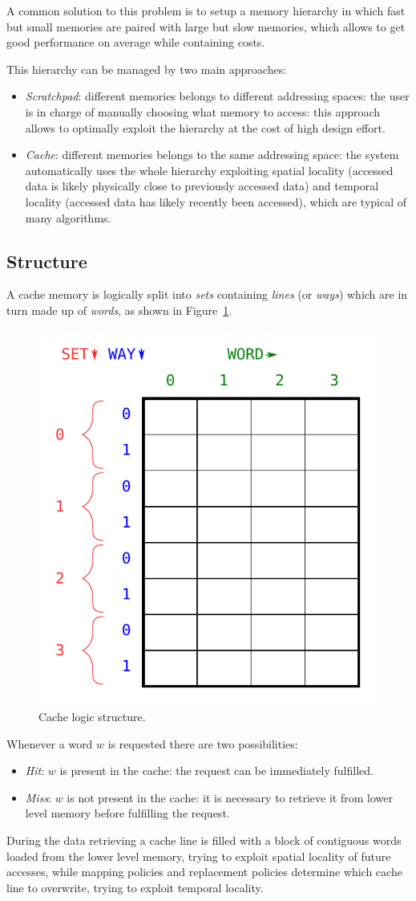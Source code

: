 \documentclass[11pt,a4paper,oneside]{memoir}
\begin{document}
A common solution to this problem is to setup a memory hierarchy in
which fast but small memories are paired with large but slow memories, which
allows to get good performance on average while containing costs.

This hierarchy can be managed by two main approaches:
\begin{itemize}
	\item \emph{Scratchpad}: different memories belongs to different
		addressing spaces: the user is in charge of manually choosing
		what memory to access: this approach allows to optimally
		exploit the hierarchy at the cost of high design effort.
	\item \emph{Cache}: different memories belongs to the same addressing
		space: the system automatically uses the whole hierarchy
		exploiting spatial locality (accessed data is likely physically
		close to previously accessed data) and temporal locality
		(accessed data has likely recently been accessed), which are
		typical of many algorithms.
\end{itemize}

\subsection{Structure}
A cache memory is logically split into \emph{sets} containing \emph{lines} (or
\emph{ways}) which are in turn made up of \emph{words}, as shown in
Figure~\ref{fig:cache_logic_structure}.

\begin{figure}
	\centering
	\includegraphics[width=.5\textwidth]{cache_logic_structure}
	\caption{Cache logic structure.}
	\label{fig:cache_logic_structure}
\end{figure}

Whenever a word $w$ is requested there are two possibilities:
\begin{itemize}
	\item \emph{Hit}: $w$ is present in the cache: the request can be
		immediately fulfilled.
	\item \emph{Miss}: $w$ is not present in the cache: it is necessary to
		retrieve it from lower level memory before fulfilling the
		request.
\end{itemize}
During the data retrieving a cache line is filled with a block of contiguous
words loaded from the lower level memory, trying to exploit spatial locality of
future accesses, while mapping policies and replacement policies determine which
cache line to overwrite, trying to exploit temporal locality.
\end{document}
